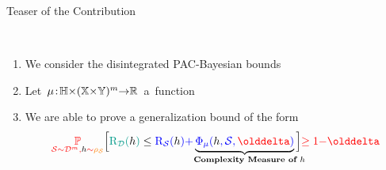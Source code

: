 \documentclass{slides}
\begin{document}

\begin{xframe}{Teaser of the Contribution}

\vfill

\begin{redbox}{}
\\
\begin{enumerate}
    \item We consider the disintegrated PAC-Bayesian bounds
    \item \mbox{Let $\operatorname{\mu}\!:\! \mathbb{H}{\times}(\mathbb{X}{\times}\mathbb{Y})^m {\to} \mathbb{R}$ a function}
    \item We are able to prove a generalization bound of the form
    \begin{align*}
        \red{\PP_{\dS\sim\Dcal^\m, \h\sim\AQ}}\Big[ \green{\Risk_{\D}(\h)} \le \blue{\Risk_{\dS}(\h) + }\underbrace{\blue{\PhiComp(\h,\dS,\delta)}}_{\hspace{0.3cm}\mathclap{\text{\bf Complexity Measure of }h}} \Big] \red{\ge 1{-}\delta}
    \end{align*}
\end{enumerate}    
\end{redbox}
\end{xframe}

\end{document}
